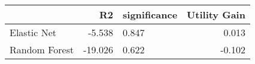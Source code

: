 \begin{tabular}{lrlr}
\toprule
{} &      R2 & significance &  Utility Gain \\
\midrule
Elastic Net   &  -5.538 &       0.847  &         0.013 \\
Random Forest & -19.026 &       0.622  &        -0.102 \\
\bottomrule
\end{tabular}
